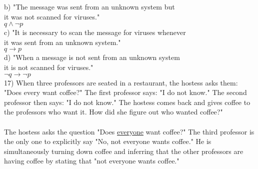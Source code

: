 \documentclass{article}
\begin{document}
\begin{flushleft}
\setlength\parindent{48pt}b) "The message was sent from an unknown system but \\
\setlength\parindent{48pt}it was not scanned for viruses."\\
\setlength\parindent{55pt}$q \land \neg p$\\
\setlength\parindent{48pt}c) "It is necessary to scan the message for viruses whenever\\
\setlength\parindent{48pt}it was sent from an unknown system."\\
\setlength\parindent{55pt}$q \rightarrow p$\\
\setlength\parindent{48pt}d) "When a message is not sent from an unknown system \\
\setlength\parindent{48pt}it is not scanned for viruses."\\
\setlength\parindent{55pt}$\neg q \rightarrow \neg p$\\
\setlength\parindent{0pt}17) When three professors are seated in a restaurant, the hostess asks them: "Does every want coffee?" The first professor says: "I do not know."  The second professor then says: "I do not know." The hostess comes back and gives coffee to the professors who want it.  How did she figure out who wanted coffee?" \\
~\\The hostess asks the question "Does \underline{everyone} want coffee?"  The third professor is the only one to explicitly say "No, not everyone wants coffee."  He is simultaneously turning down coffee and inferring that the other professors are having coffee by stating that "not everyone wants coffee." \\


\end{flushleft}
\end{document}
